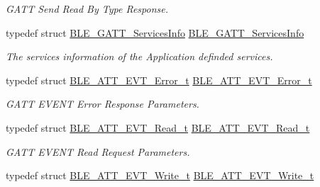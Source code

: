 \begin{DoxyCompactItemize}
\begin{DoxyCompactList}\small\item\em G\+A\+TT Send Read By Type Response. \end{DoxyCompactList}\item 
typedef struct \hyperlink{struct_b_l_e___g_a_t_t___services_info}{B\+L\+E\+\_\+\+G\+A\+T\+T\+\_\+\+Services\+Info} \hyperlink{group___b_l_e___g_a_t_t_ga051577f7154aff0ba20b321a00f866ff}{B\+L\+E\+\_\+\+G\+A\+T\+T\+\_\+\+Services\+Info}\hypertarget{group___b_l_e___g_a_t_t_ga051577f7154aff0ba20b321a00f866ff}{}\label{group___b_l_e___g_a_t_t_ga051577f7154aff0ba20b321a00f866ff}

\begin{DoxyCompactList}\small\item\em The services information of the Application definded services. \end{DoxyCompactList}\item 
typedef struct \hyperlink{struct_b_l_e___a_t_t___e_v_t___error__t}{B\+L\+E\+\_\+\+A\+T\+T\+\_\+\+E\+V\+T\+\_\+\+Error\+\_\+t} \hyperlink{group___b_l_e___g_a_t_t_gaf2575de36e06b52a2e03771a54df0ad3}{B\+L\+E\+\_\+\+A\+T\+T\+\_\+\+E\+V\+T\+\_\+\+Error\+\_\+t}\hypertarget{group___b_l_e___g_a_t_t_gaf2575de36e06b52a2e03771a54df0ad3}{}\label{group___b_l_e___g_a_t_t_gaf2575de36e06b52a2e03771a54df0ad3}

\begin{DoxyCompactList}\small\item\em G\+A\+TT E\+V\+E\+NT Error Response Parameters. \end{DoxyCompactList}\item 
typedef struct \hyperlink{struct_b_l_e___a_t_t___e_v_t___read__t}{B\+L\+E\+\_\+\+A\+T\+T\+\_\+\+E\+V\+T\+\_\+\+Read\+\_\+t} \hyperlink{group___b_l_e___g_a_t_t_ga7673543d58a87f7d4b4fe2cb8152519c}{B\+L\+E\+\_\+\+A\+T\+T\+\_\+\+E\+V\+T\+\_\+\+Read\+\_\+t}\hypertarget{group___b_l_e___g_a_t_t_ga7673543d58a87f7d4b4fe2cb8152519c}{}\label{group___b_l_e___g_a_t_t_ga7673543d58a87f7d4b4fe2cb8152519c}

\begin{DoxyCompactList}\small\item\em G\+A\+TT E\+V\+E\+NT Read Request Parameters. \end{DoxyCompactList}\item 
typedef struct \hyperlink{struct_b_l_e___a_t_t___e_v_t___write__t}{B\+L\+E\+\_\+\+A\+T\+T\+\_\+\+E\+V\+T\+\_\+\+Write\+\_\+t} \hyperlink{group___b_l_e___g_a_t_t_ga660cc2a870493eadb3f224eca9dd5c79}{B\+L\+E\+\_\+\+A\+T\+T\+\_\+\+E\+V\+T\+\_\+\+Write\+\_\+t}\hypertarget{group___b_l_e___g_a_t_t_ga660cc2a870493eadb3f224eca9dd5c79}{}\label{group___b_l_e___g_a_t_t_ga660cc2a870493eadb3f224eca9dd5c79}


\end{DoxyCompactItemize}
